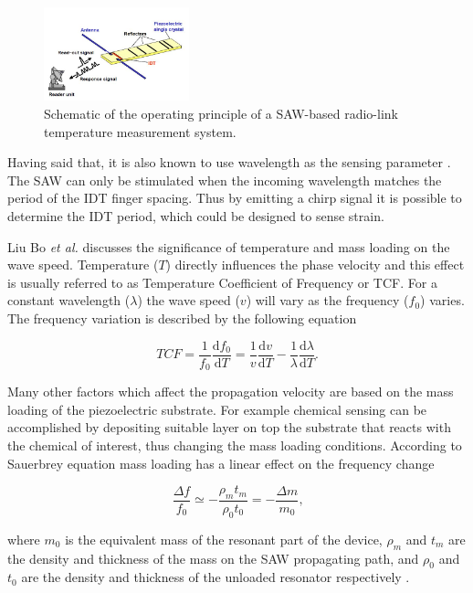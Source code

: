 \documentclass[11pt,a4paper]{article}
\begin{document}
\begin{figure}[h]
\centering
\includegraphics[width=0.375\textwidth]{SAWdelay.JPG}
\caption{Schematic of the operating principle of a SAW-based radio-link temperature measurement system. \cite{SAW1}\label{fig:SAWbasic}}
\end{figure}

Having said that, it is also known to use wavelength as the sensing parameter \cite{SAWapps}. The SAW can only be stimulated when the incoming wavelength matches the period of the IDT finger spacing. Thus by emitting a chirp signal it is possible to determine the IDT period, which could be designed to sense strain.

Liu Bo \textit{et al.} \cite{SAWapps} discusses the significance of temperature and mass loading on the wave speed. Temperature ($T$) directly influences the phase velocity and this effect is usually referred to as Temperature Coefficient of Frequency or TCF. For a constant wavelength ($\lambda$) the wave speed ($v$) will vary as the frequency ($f_0$) varies. The frequency variation is described by the following equation

\begin{equation}
TCF = \frac{1}{f_0}\frac{\textrm{d}f_0}{\textrm{d}T} = \frac{1}{v}\frac{\textrm{d}v}{\textrm{d}T}- \frac{1}{\lambda}\frac{\textrm{d}\lambda}{\textrm{d}T}\textrm{.}
\end{equation}


Many other factors which affect the propagation velocity are based on the mass loading of the piezoelectric substrate. For example chemical sensing can be accomplished by depositing suitable layer on top the substrate that reacts with the chemical of interest, thus changing the mass loading conditions. According to Sauerbrey equation \cite{mass} mass loading has a linear effect on the frequency change

\begin{equation}
\frac{\Delta f}{f_0} \simeq -\frac{\rho _m t_m}{\rho _0 t_0} = -\frac{\Delta m}{m_0}\textrm{,}
\end{equation}

where $m_0$ is the equivalent mass of the resonant part of the device, $\rho _m$ and $t_m$ are the density and thickness of the mass on the SAW propagating path, and $\rho _0$ and $t_0$ are the density and thickness of the unloaded resonator respectively \cite{SAWapps}.
\end{document}
